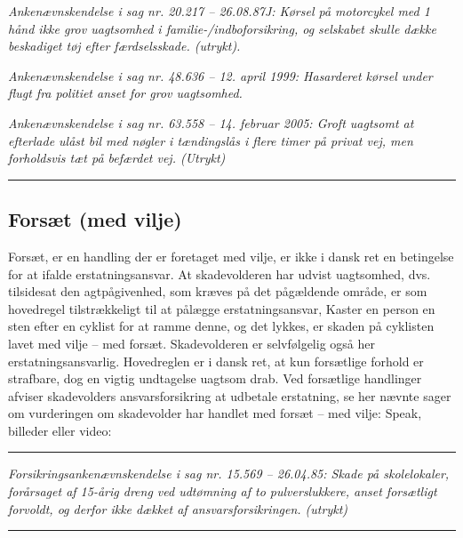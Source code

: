 \documentclass[]{book}
\begin{document}
\emph{Ankenævnskendelse i sag nr. 20.217 -- 26.08.87J: Kørsel på motorcykel med 1 hånd ikke grov uagtsomhed i familie-/indboforsikring, og selskabet skulle dække beskadiget tøj efter færdselsskade. (utrykt).}

\emph{Ankenævnskendelse i sag nr. 48.636 -- 12. april 1999: Hasarderet kørsel under flugt fra politiet anset for grov uagtsomhed.}

\emph{Ankenævnskendelse i sag nr. 63.558 -- 14. februar 2005: Groft uagtsomt at efterlade ulåst bil med nøgler i tændingslås i flere timer på privat vej, men forholdsvis tæt på befærdet vej. (Utrykt)}

\begin{center}\rule{0.5\linewidth}{\linethickness}\end{center}

\hypertarget{forst-med-vilje}{%
\subsection{Forsæt (med vilje)}\label{forst-med-vilje}}

Forsæt, er en handling der er foretaget med vilje, er ikke i dansk ret en betingelse for at ifalde erstatningsansvar. At skadevolderen har udvist uagtsomhed, dvs. tilsidesat den agtpågivenhed, som kræves på det pågældende område, er som hovedregel tilstrækkeligt til at pålægge erstatningsansvar, Kaster en person en sten efter en cyklist for at ramme denne, og det lykkes, er skaden på cyklisten lavet med vilje -- med forsæt. Skadevolderen er selvfølgelig også her erstatningsansvarlig. Hovedreglen er i dansk ret, at kun forsætlige forhold er strafbare, dog en vigtig undtagelse uagtsom drab. Ved forsætlige handlinger afviser skadevolders ansvarsforsikring at udbetale erstatning, se her nævnte sager om vurderingen om skadevolder har handlet med forsæt -- med vilje:
Speak, billeder eller video:

\begin{center}\rule{0.5\linewidth}{\linethickness}\end{center}

\emph{Forsikringsankenævnskendelse i sag nr. 15.569 -- 26.04.85: Skade på skolelokaler, forårsaget af 15-årig dreng ved udtømning af to pulverslukkere, anset forsætligt forvoldt, og derfor ikke dækket af ansvarsforsikringen. (utrykt)}

\begin{center}\rule{0.5\linewidth}{\linethickness}\end{center}
\end{document}

